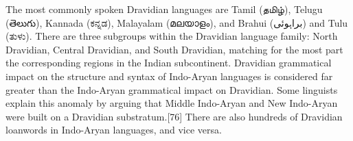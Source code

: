 The most commonly spoken Dravidian languages are Tamil (தமிழ்), Telugu (తెలుగు), Kannada (ಕನ್ನಡ), Malayalam (മലയാളം), and Brahui (براہوئی) and Tulu (ತುಳು). There are three subgroups within the Dravidian language family: North Dravidian, Central Dravidian, and South Dravidian, matching for the most part the corresponding regions in the Indian subcontinent.
Dravidian grammatical impact on the structure and syntax of Indo-Aryan languages is considered far greater than the Indo-Aryan grammatical impact on Dravidian. Some linguists explain this anomaly by arguing that Middle Indo-Aryan and New Indo-Aryan were built on a Dravidian substratum.[76] There are also hundreds of Dravidian loanwords in Indo-Aryan languages, and vice versa.




















